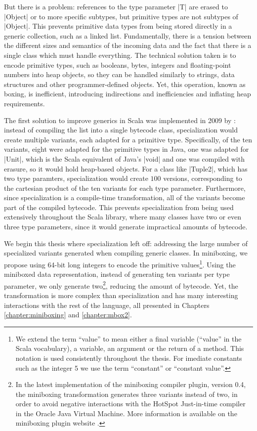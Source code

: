 But there is a problem: references to the type parameter |T| are erased to |Object| or to more specific subtypes, but primitive types are not subtypes of |Object|. This prevents primitive data types from being stored directly in a generic collection, such as a linked list. Fundamentally, there is a tension between the different sizes and semantics of the incoming data and the fact that there is a single class which must handle everything. The technical solution taken is to encode primitive types, such as booleans, bytes, integers and floating-point numbers into heap objects, so they can be handled similarly to strings, data structures and other programmer-defined objects. Yet, this operation, known as boxing, is inefficient, introducing indirections and inefficiencies and inflating heap requirements.

The first solution to improve generics in Scala was implemented in 2009 by  \cite{iuli-thesis, specialization-iuli}: instead of compiling the list into a single bytecode class, specialization would create multiple variants, each adapted for a primitive type. Specifically, of the ten variants, eight were adapted for the primitive types in Java, one was adapted for |Unit|, which is the Scala equivalent of Java's |void| and one was compiled with erasure, so it would hold heap-based objects. For a class like |Tuple2|, which has two type paramters, specialization would create $100$ versions, corresponding to the cartesian product of the ten variants for each type parameter. Furthermore, since specialization is a compile-time transformation, all of the variants become part of the compiled bytecode. This prevents specialization from being used extensively throughout the Scala library, where many classes have two or even three type parameters, since it would generate impractical amounts of bytecode.

We begin this thesis where specialization left off: addressing the large number of specialized variants generated when compiling generic classes. In miniboxing, we propose using 64-bit long integers to encode the primitive values\footnote{We extend the term ``value'' to mean either a final variable (``value'' in the Scala vocabulary), a variable, an argument or the return of a method. This notation is used consistently throughout the thesis. For imediate constants such as the integer 5 we use the term ``constant'' or ``constant value''.}. Using the miniboxed data representation, instead of generating ten variants per type parameter, we only generate two\footnote{In the latest implementation of the miniboxing compiler plugin, version 0.4, the miniboxing transformation generates three variants instead of two, in order to avoid negative interactions with the HotSpot Just-in-time compiler in the Oracle Java Virtual Machine. More information is available on the miniboxing plugin website \cite{miniboxing-www}.}, reducing the amount of bytecode. Yet, the transformation is more complex than specialization and has many interesting interactions with the rest of the language, all presented in Chapters \ref{chapter:miniboxing} and \ref{chapter:mbox2}.

